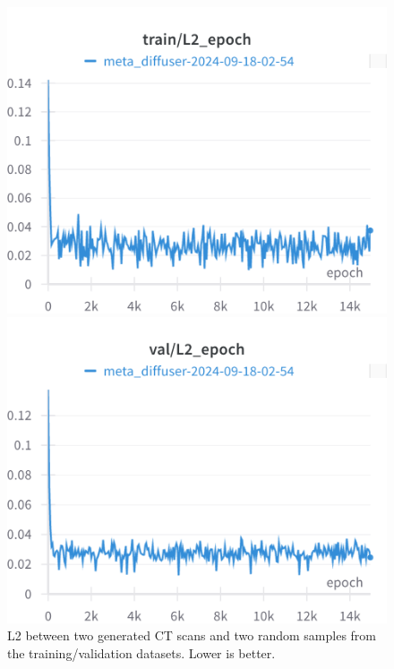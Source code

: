 \begin{figure}[H]
\includegraphics[width=\linewidth]{detailed_engineering/Meta Diffusion/charts/train_l2_epoch.png}

\endminipage\hfill
{}
\includegraphics[width=\linewidth]{detailed_engineering/Meta Diffusion/charts/val_l2_epoch.png}

\endminipage
\caption{L2 between two generated CT scans and two random samples from the training/validation datasets. Lower is better.}
\end{figure}


